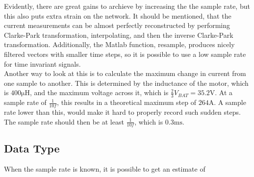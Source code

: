 
Evidently, there are great gains to archieve by increasing the the sample rate, but this also puts extra strain on the network.
It should be mentioned, that the current measurements can be almost perfectly reconstructed by performing Clarke-Park transformation, interpolating, and then the inverse Clarke-Park transformation.
Additionally, the Matlab function, resample, produces nicely filtered vectors with smaller time steps, so it is possible to use a low sample rate for time invariant signals.\\

Another way to look at this is to calculate the maximum change in current from one sample to another.
This is determined by the inductance of the motor, which is $400 \si{\micro \henry}$, and the maximum voltage across it, which is $\frac{2}{3} V_{BAT}=35.2 \si{\volt}$. 
At a sample rate of $\frac{1}{10f}$, this results in a theoretical maximum step of $264\si{\ampere}$.
A sample rate lower than this, would make it hard to properly record such sudden steps. 
The sample rate should then be at least $\frac{1}{10f}$, which is $0.3\si{\milli \second}$.

\subsection{Data Type}
When the sample rate is known, it is possible to get an estimate of 

